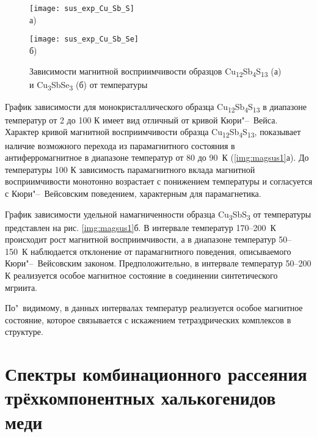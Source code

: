 \begin{figure}[pt!]
  \begin{minipage}[ht]{0.9\linewidth}\centering
    \texttt{[image: sus\_exp\_Cu\_Sb\_S]} \\ а)
  \end{minipage}
\vfill
  \begin{minipage}[ht]{0.9\linewidth}\centering
    \texttt{[image: sus\_exp\_Cu\_Sb\_Se]} \\ б)
  \end{minipage}
      \caption[Зависимости магнитной восприимчивости образцов Cu\textsubscript{12}Sb\textsubscript{4}S\textsubscript{13} (а) и Cu\textsubscript{3}SbSe\textsubscript{3} (б) от температуры]{Зависимости магнитной восприимчивости образцов Cu\textsubscript{12}Sb\textsubscript{4}S\textsubscript{13} (а) и Cu\textsubscript{3}SbSe\textsubscript{3} (б) от температуры}
    \label{img:magsus2}
\end{figure}

График зависимости для монокристаллического образца Cu\textsubscript{12}Sb\textsubscript{4}S\textsubscript{13} в диапазоне температур от 2 до 100 К имеет вид отличный от кривой Кюри"--~Вейса.
 Характер кривой магнитной восприимчивости образца  Cu\textsubscript{12}Sb\textsubscript{4}S\textsubscript{13}, показывает наличие возможного перехода из парамагнитного состояния в антиферромагнитное в диапазоне температур от 80 до 90~К (\ref{img:magsus1}а).
До температуры 100 К зависимость парамагнитного вклада магнитной восприимчивости монотонно возрастает с понижением температуры и согласуется с Кюри"--~Вейсовским поведением, характерным для парамагнетика.

График зависимости удельной намагниченности образца Cu\textsubscript{3}SbS\textsubscript{3} от температуры представлен на рис. \ref{img:magsus1}б.
В интервале температур 170--200~К происходит рост магнитной восприимчивости, а в диапазоне температур 50--150~К наблюдается отклонение от парамагнитного поведения, описываемого Кюри"--~Вейсовским законом.
Предположительно, в интервале температур 50--200 К реализуется особое магнитное состояние в соединении синтетического мгриита.


По"~видимому, в данных интервалах температур реализуется особое магнитное состояние, которое связывается с искажением тетраэдрических комплексов в структуре.

\newpage

\section{Спектры комбинационного рассеяния трёхкомпонентных халькогенидов меди} \label{sect4_2}


